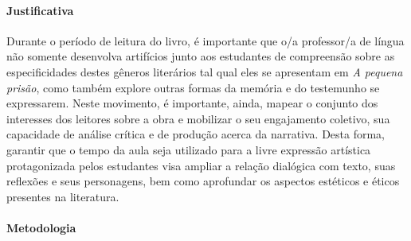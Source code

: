 \documentclass[11pt]{extarticle}
\begin{document}
\paragraph{Justificativa} Durante o período de leitura do livro, é
importante que o/a professor/a de língua não somente desenvolva
artifícios junto aos estudantes de compreensão sobre as especificidades
destes gêneros literários tal qual eles se apresentam em \emph{A pequena
prisão}, como também explore outras formas da memória e do testemunho se
expressarem. Neste movimento, é importante, ainda, mapear o conjunto dos
interesses dos leitores sobre a obra e mobilizar o seu engajamento
coletivo, sua capacidade de análise crítica e de produção acerca da
narrativa. Desta forma, garantir que o tempo da aula seja utilizado para
a livre expressão artística protagonizada pelos estudantes visa ampliar
a relação dialógica com texto, suas reflexões e seus personagens, bem
como aprofundar os aspectos estéticos e éticos presentes na literatura.

\paragraph{Metodologia} 
\end{document}
